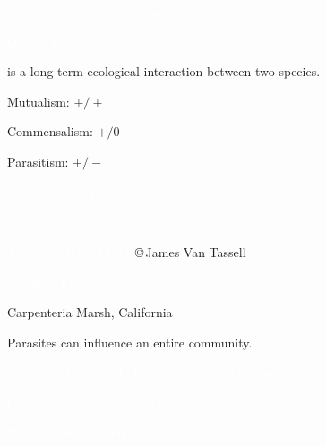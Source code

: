 \documentclass[t]{beamer}
\begin{document}

{
\begin{frame}[b]{\textcolor{white}{Plants evolve defenses against \textcolor{orange4}{herbivory} $(+ / -)$.}}

	\hfill\tiny\textcolor{white}{Olgierd Rudak, Wikimedia }

\end{frame}
}
%
\begin{frame}{ is a long-term ecological interaction between two species.}

	\hangpara Mutualism: $ + / + $ 
	
	\hangpara Commensalism: $ + / 0$
	
	\hangpara Parasitism: $ + / - $ 
		
\end{frame}

%
{
\begin{frame}[b]{}
\hfill\tiny\textcolor{white}{Kevin  Bryant, Flickr }
\end{frame}
}
%
{
\begin{frame}[t]

\vspace*{70mm}

\hfill \tiny \textcolor{white}{\copyright\,Dave Burdick}

\vfilll

\tiny \textcolor{white}{James St. John, Flickr } \hfill \copyright\,James Van Tassell
\end{frame}
}
%
{
\begin{frame}[b]{}
\hfill\tiny\textcolor{white}{edgeplot, Flickr }
\end{frame}
}
%
{
\begin{frame}[t]{Carpenteria Marsh, California}
\end{frame}
}
%
{
\begin{frame}[t]{Parasites can influence an entire community.}
\end{frame}
}
%
{
\begin{frame}[b]{}
\hfill\tiny\textcolor{white}{\textcopyright\,Theodore W. Pietsch, University of Washington.}
\end{frame}
}
%
%
{
	\begin{frame}[b]{\textcolor{white}{Can predators evolve resistance to cane toad toxins?}}
		
		\vfilll
		
		\hfill \tiny \textcolor{white}{Brian Gratwicke, Wikimedia }
	\end{frame}
}

\end{document}

